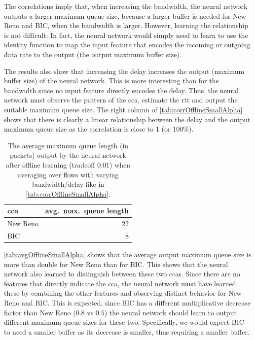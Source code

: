 \documentclass[conference]{IEEEtran}
\begin{document}
The correlations imply that, when increasing the bandwidth, the neural network outputs a larger maximum queue size, because a larger buffer is needed for New Reno and BIC, when the bandwidth is larger. However, learning the relationship is not difficult: In fact, the neural network would simply need to learn to use the identity function to map the input feature that encodes the incoming or outgoing data rate to the output (the output maximum buffer size). 

The results also show that increasing the delay increases the output (maximum buffer size) of the neural network. This is more interesting than for the bandwidth since no input feature directly encodes the delay. Thus, the neural network must observe the pattern of the \gls{cca}, estimate the \gls{rtt} and output the suitable maximum queue size. The right column of \autoref{tab:corrOfflineSmallAlpha} shows that there is clearly a linear relationship between the delay and the output maximum queue size as the correlation is close to 1 (or 100\%). 

\begin{table}[h]
\caption{The average maximum queue length (in packets) output by the neural network after offline learning (tradeoff $0.01$) when averaging over flows with varying bandwidth/delay like in \autoref{tab:corrOfflineSmallAlpha}.} \label{tab:avgOfflineSmallAlpha}
\centering
\begin{tabular}{lr} \toprule
\gls{cca} & avg.~max.~queue length \\ \midrule
New Reno & 22 \\
BIC & 8 \\
\bottomrule
\end{tabular}
\end{table}

\autoref{tab:avgOfflineSmallAlpha} shows that the average output maximum queue size is more than double for New Reno than for BIC. This shows that the neural network also learned to distinguish between these two \glspl{cca}. Since there are no features that directly indicate the \gls{cca}, the neural network must have learned these by combining the other features and observing distinct behavior for New Reno and BIC. This is expected, since BIC has a different multiplicative decrease factor than New Reno ($0.8$ vs $0.5$) the neural network should learn to output different maximum queue sizes for these two. Specifically, we would expect BIC to need a smaller buffer as its decrease is smaller, thus requiring a smaller buffer. 
\end{document}
